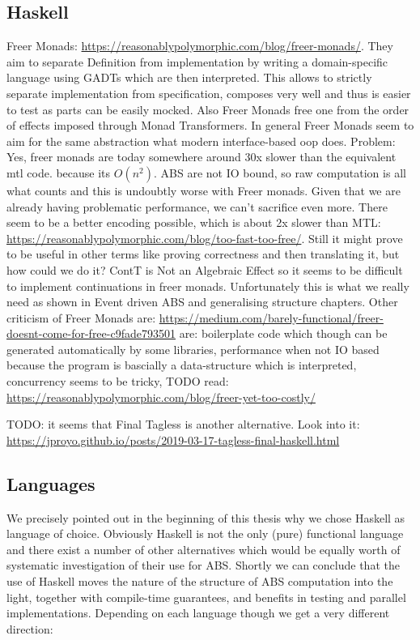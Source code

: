 \subsection{Haskell}
Freer Monads: \url{https://reasonablypolymorphic.com/blog/freer-monads/}. They aim to separate Definition from implementation by writing a domain-specific language using GADTs which are then interpreted. This allows to strictly separate implementation from specification, composes very well and thus is easier to test as parts can be easily mocked. Also Freer Monads free one from the order of effects imposed through Monad Transformers. In general Freer Monads seem to aim for the same abstraction what modern interface-based oop does.
Problem: Yes, freer monads are today somewhere around 30x slower than the equivalent mtl code. because its $O(n^2)$. ABS are not IO bound, so raw computation is all what counts and this is undoubtly worse with Freer monads. Given that we are already having problematic performance, we can't sacrifice even more. There seem to be a better encoding possible, which is about 2x slower than MTL: \url{https://reasonablypolymorphic.com/blog/too-fast-too-free/}. Still it might prove to be useful in other terms like proving correctness and then translating it, but how could we do it?  
ContT is Not an Algebraic Effect so it seems to be difficult to implement continuations in freer monads. Unfortunately this is what we really need as shown in Event driven ABS and generalising structure chapters.
Other criticism of Freer Monads are: \url{https://medium.com/barely-functional/freer-doesnt-come-for-free-c9fade793501} are: boilerplate code which though can be generated automatically by some libraries, performance when not IO based because the program is bascially a data-structure which is interpreted, concurrency seems to be tricky, 
TODO read: \url{https://reasonablypolymorphic.com/blog/freer-yet-too-costly/}

TODO: it seems that Final Tagless is another alternative. Look into it: \url{https://jproyo.github.io/posts/2019-03-17-tagless-final-haskell.html}

\subsection{Languages}
We precisely pointed out in the beginning of this thesis why we chose Haskell as language of choice. Obviously Haskell is not the only (pure) functional language and there exist a number of other alternatives which would be equally worth of systematic investigation of their use for ABS. Shortly we can conclude that the use of Haskell moves the nature of the structure of ABS computation into the light, together with compile-time guarantees, and benefits in testing and parallel implementations. Depending on each language though we get a very different direction:

